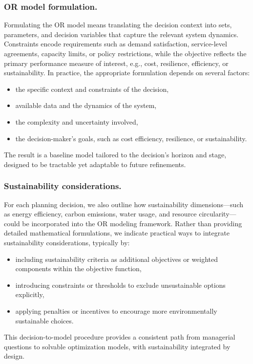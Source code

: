 \documentclass[pdflatex,sn-mathphys-num]{sn-jnl}
\theoremstyle{thmstyleone}
\theoremstyle{thmstyletwo}
\theoremstyle{thmstylethree}
\begin{document}
\subsubsection{OR model formulation.}
Formulating the OR model means translating the decision context into sets, parameters, and decision variables that capture the relevant system dynamics. Constraints encode requirements such as demand satisfaction, service-level agreements, capacity limits, or policy restrictions, while the objective reflects the primary performance measure of interest, e.g., cost, resilience, efficiency, or sustainability.  
In practice, the appropriate formulation depends on several factors:
\begin{itemize} 
    \item the specific context and constraints of the decision,
    \item available data and the dynamics of the system,
    \item the complexity and uncertainty involved,
    \item the decision-maker’s goals, such as cost efficiency, resilience, or sustainability.
\end{itemize}
The result is a baseline model tailored to the decision’s horizon and stage, designed to be tractable yet adaptable to future refinements.


\subsubsection{Sustainability considerations.}

For each planning decision, we also outline how sustainability dimensions—such as energy efficiency, carbon emissions, water usage, and resource circularity—could be incorporated into the OR modeling framework. Rather than providing detailed mathematical formulations, we indicate practical ways to integrate sustainability considerations, typically by:
\begin{itemize}
    \item including sustainability criteria as additional objectives or weighted components within the objective function,
    \item introducing constraints or thresholds to exclude unsustainable options explicitly,
    \item applying penalties or incentives to encourage more environmentally sustainable choices.
\end{itemize}

This decision-to-model procedure provides a consistent path from managerial questions to solvable optimization models, with sustainability integrated by design. 
\end{document}

